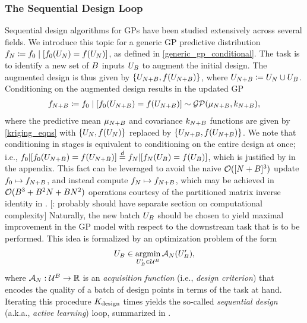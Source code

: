 \documentclass[12pt]{article}
\begin{document}
\subsubsection{The Sequential Design Loop}
Sequential design algorithms for GPs have been studied extensively across several fields. We introduce this topic 
for a generic GP predictive distribution $\funcEm[\Ndesign] \Def \funcPrior \given [\funcPrior(\designIn) = \func(\designIn)]$, 
as defined in \ref{generic_gp_conditional}. The task is to identify a new set of $\Nbatch$ inputs $\designBatchIn$ to 
augment the initial design. The augmented design is thus given by 
$\{\designIn[\Naugment], \func(\designIn[\Naugment])\}$, where 
$\designIn[\Naugment] \Def \designIn[\Ndesign] \cup \designBatchIn$. 
Conditioning on the augmented design results in the updated GP
\begin{align}
\funcEm[\Naugment] \Def \funcPrior \given [\funcPrior(\designIn[\Naugment]) = \func(\designIn[\Naugment])] \sim \GP(\gpMean[\Naugment], \gpKer[\Naugment]),
\end{align}
where the predictive mean $\gpMean[\Naugment]$ and covariance $\gpKer[\Naugment]$ functions are given by \ref{kriging_eqns}
with $\{\designIn, \func(\designIn)\}$ replaced by $\{\designIn[\Naugment], \func(\designIn[\Naugment])\}$. 
We note that conditioning in stages is equivalent to conditioning on the entire design at once; i.e.,
$\funcPrior|[\funcPrior(\designIn[\Naugment]) = \func(\designIn[\Naugment])] \eqDist 
\funcEm[\Ndesign]|[\funcEm[\Ndesign](\designIn[\Nbatch]) = \func(\designBatchIn)]$, which is justified 
by  in the appendix. This fact can be leveraged to avoid the 
naive $\BigO([\Ndesign + \Nbatch]^3)$ update $\funcPrior \mapsto \funcEm[\Naugment]$, and instead 
compute $\funcEm[\Ndesign] \mapsto \funcEm[\Naugment]$, which may be achieved in 
$\BigO(\Nbatch^3 + \Nbatch^2 \Ndesign + \Nbatch \Ndesign^2)$ operations courtesy of the 
partitioned matrix inverse identity in .
[\todo: probably should have separate section on computational complexity]
Naturally, the new batch $\designBatchIn$ should be chosen to 
yield maximal improvement in the GP model with respect to the downstream task that is to be performed. 
This idea is formalized by an optimization problem of the form 
\begin{align}
\designBatchIn \in \argmin_{\designBatchIn^\prime \in \parSpace^{\Nbatch}} \acq[\Ndesign](\designBatchIn^\prime), \label{acq_func_opt}
\end{align}
where $\acq[\Ndesign]: \parSpace^{\Nbatch} \to \R$ is an \textit{acquisition function} (i.e., \textit{design criterion}) that 
encodes the quality of a batch of design points in terms of the task at hand. Iterating this procedure $\Nrounds$ times yields the so-called 
\textit{sequential design} (a.k.a., \textit{active learning}) loop, summarized in .  
\end{document}
